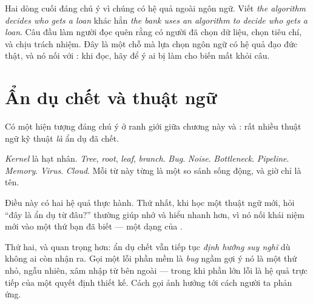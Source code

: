 \documentclass[../../english.tex]{subfiles}
\begin{document}
\begin{tuvung}
\end{tuvung}

Hai dòng cuối đáng chú ý vì chúng có hệ quả ngoài ngôn ngữ. Viết \emph{the algorithm decides who gets a loan} khác hẳn \emph{the bank uses an algorithm to decide who gets a loan}. Câu đầu làm người đọc quên rằng có người đã chọn dữ liệu, chọn tiêu chí, và chịu trách nhiệm. Đây là một chỗ mà lựa chọn ngôn ngữ có hệ quả đạo đức thật, và nó nối với : khi đọc, hãy để ý ai bị làm cho biến mất khỏi câu.

\section{Ẩn dụ chết và thuật ngữ}

Có một hiện tượng đáng chú ý ở ranh giới giữa chương này và : rất nhiều thuật ngữ kỹ thuật \emph{là} ẩn dụ đã chết.

\emph{Kernel} là hạt nhân. \emph{Tree}, \emph{root}, \emph{leaf}, \emph{branch}. \emph{Bug}. \emph{Noise}. \emph{Bottleneck}. \emph{Pipeline}. \emph{Memory}. \emph{Virus}. \emph{Cloud}. Mỗi từ này từng là một so sánh sống động, và giờ chỉ là tên.

Điều này có hai hệ quả thực hành. Thứ nhất, khi học một thuật ngữ mới, hỏi ``đây là ẩn dụ từ đâu?'' thường giúp nhớ và hiểu nhanh hơn, vì nó nối khái niệm mới vào một thứ bạn đã biết --- một dạng của .

Thứ hai, và quan trọng hơn: ẩn dụ chết vẫn tiếp tục \emph{định hướng suy nghĩ} dù không ai còn nhận ra. Gọi một lỗi phần mềm là \emph{bug} ngầm gợi ý nó là một thứ nhỏ, ngẫu nhiên, xâm nhập từ bên ngoài --- trong khi phần lớn lỗi là hệ quả trực tiếp của một quyết định thiết kế. Cách gọi ảnh hưởng tới cách người ta phản ứng.
\end{document}
